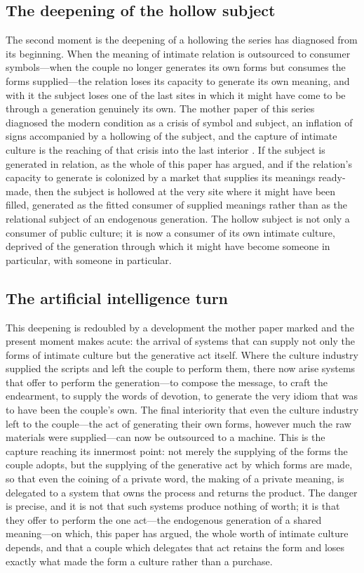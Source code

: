 \subsection*{The deepening of the hollow subject}

The second moment is the deepening of a hollowing the series has diagnosed from its beginning. When the meaning of intimate relation is outsourced to consumer symbols---when the couple no longer generates its own forms but consumes the forms supplied---the relation loses its capacity to generate its own meaning, and with it the subject loses one of the last sites in which it might have come to be through a generation genuinely its own. The mother paper of this series diagnosed the modern condition as a crisis of symbol and subject, an inflation of signs accompanied by a hollowing of the subject, and the capture of intimate culture is the reaching of that crisis into the last interior \parencite{wan2024grb}. If the subject is generated in relation, as the whole of this paper has argued, and if the relation's capacity to generate is colonized by a market that supplies its meanings ready-made, then the subject is hollowed at the very site where it might have been filled, generated as the fitted consumer of supplied meanings rather than as the relational subject of an endogenous generation. The hollow subject is not only a consumer of public culture; it is now a consumer of its own intimate culture, deprived of the generation through which it might have become someone in particular, with someone in particular.

\subsection*{The artificial intelligence turn}

This deepening is redoubled by a development the mother paper marked and the present moment makes acute: the arrival of systems that can supply not only the forms of intimate culture but the generative act itself. Where the culture industry supplied the scripts and left the couple to perform them, there now arise systems that offer to perform the generation---to compose the message, to craft the endearment, to supply the words of devotion, to generate the very idiom that was to have been the couple's own. The final interiority that even the culture industry left to the couple---the act of generating their own forms, however much the raw materials were supplied---can now be outsourced to a machine. This is the capture reaching its innermost point: not merely the supplying of the forms the couple adopts, but the supplying of the generative act by which forms are made, so that even the coining of a private word, the making of a private meaning, is delegated to a system that owns the process and returns the product. The danger is precise, and it is not that such systems produce nothing of worth; it is that they offer to perform the one act---the endogenous generation of a shared meaning---on which, this paper has argued, the whole worth of intimate culture depends, and that a couple which delegates that act retains the form and loses exactly what made the form a culture rather than a purchase.

